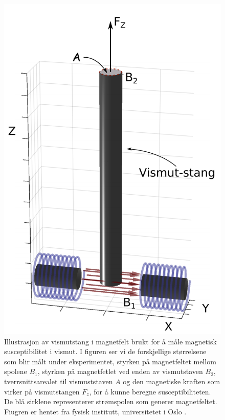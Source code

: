 \documentclass[%
 reprint,
 amsmath,amssymb,
 aps,
 norsk,
]{revtex4-1}
\begin{document}
\begin{figure}[h!]
  \centering
  \includegraphics[scale=0.38]{oppsett1.png}
  \caption{Illustrasjon av vismutstang i magnetfelt brukt for å måle magnetisk susceptibilitet i vismut. I figuren ser vi de forskjellige størrelsene som blir målt under eksperimentet, styrken på magnetfeltet mellom spolene $B_1$, styrken på magnetfetlet ved enden av vismutstaven $B_2$, tverrsnittsarealet til vismuststaven $A$ og den magnetiske kraften som virker på vismutstangen $F_z$, for å kunne beregne susceptibiliteten. De blå sirklene representerer strømspolen som generer magnetfeltet. Fiugren er hentet fra fysisk institutt, universitetet i Oslo \cite{oppgave}.}
  \label{eksperimentelt_oppsett1}
\end{figure}
\end{document}

